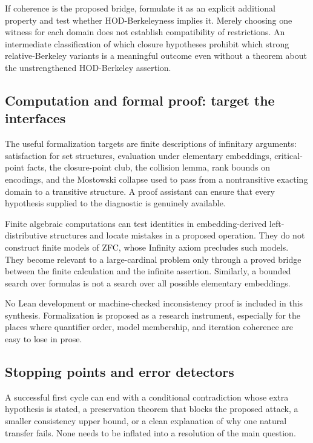 \documentclass[11pt,letterpaper]{article}
\theoremstyle{definition}
\begin{document}
If coherence is the proposed bridge, formulate it as an explicit additional property and test whether HOD-Berkeleyness implies it. Merely choosing one witness for each domain does not establish compatibility of restrictions. An intermediate classification of which closure hypotheses prohibit which strong relative-Berkeley variants is a meaningful outcome even without a theorem about the unstrengthened HOD-Berkeley assertion.

\subsection{Computation and formal proof: target the interfaces}

The useful formalization targets are finite descriptions of infinitary arguments: satisfaction for set structures, evaluation under elementary embeddings, critical-point facts, the closure-point club, the collision lemma, rank bounds on encodings, and the Mostowski collapse used to pass from a nontransitive exacting domain to a transitive structure. A proof assistant can ensure that every hypothesis supplied to the diagnostic is genuinely available.

Finite algebraic computations can test identities in embedding-derived left-distributive structures and locate mistakes in a proposed operation. They do not construct finite models of ZFC, whose Infinity axiom precludes such models. They become relevant to a large-cardinal problem only through a proved bridge between the finite calculation and the infinite assertion. Similarly, a bounded search over formulas is not a search over all possible elementary embeddings.

No Lean development or machine-checked inconsistency proof is included in this synthesis. Formalization is proposed as a research instrument, especially for the places where quantifier order, model membership, and iteration coherence are easy to lose in prose.

\subsection{Stopping points and error detectors}

A successful first cycle can end with a conditional contradiction whose extra hypothesis is stated, a preservation theorem that blocks the proposed attack, a smaller consistency upper bound, or a clean explanation of why one natural transfer fails. None needs to be inflated into a resolution of the main question.
\end{document}
